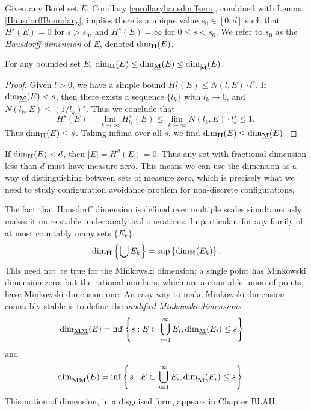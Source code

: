 Given any Borel set $E$, Corollary \ref{corollaryhausdorffzero}, combined with Lemma \ref{HausdorffBoundary}, implies there is a unique value $s_0 \in [0,d]$ such that $H^s(E) = 0$ for $s > s_0$, and $H^s(E) = \infty$ for $0 \leq s < s_0$. We refer to $s_0$ as the \emph{Hausdorff dimension} of $E$, denoted $\operatorname{\dim_{\mathbf{H}}}(E)$.

\begin{theorem}
	For any bounded set $E$, $\operatorname{\dim_{\mathbf{H}}}(E) \leq \operatorname{\dim_{\underline{\mathbf{M}}}}(E) \leq \operatorname{\dim_{\overline{\mathbf{M}}}}(E)$.
\end{theorem}
\begin{proof}
	Given $l > 0$, we have a simple bound $H^s_l(E) \leq N(l,E) \cdot l^s$. If $\operatorname{\dim_{\underline{\mathbf{M}}}}(E) < s$, then there exists a sequence $\{ l_k \}$ with $l_k \to 0$, and $N(l_k,E) \leq (1/l_k)^s$. Thus we conclude that
	\[ H^s(E) = \lim_{k \to \infty} H^s_{l_k}(E) \leq \lim_{k \to \infty} N(l_k,E) \cdot l_k^s \leq 1, \]
	Thus $\operatorname{\dim_{\mathbf{H}}}(E) \leq s$. Taking infima over all $s$, we find $\operatorname{\dim_{\mathbf{H}}}(E) \leq \operatorname{\dim_{\underline{\mathbf{M}}}}(E)$.
\end{proof}

\begin{remark}
	If $\operatorname{\dim_{\mathbf{H}}}(E) < d$, then $|E| = H^d(E) = 0$. Thus any set with fractional dimension less than $d$ must have measure zero. This means we can use the dimension as a way of distinguishing between sets of measure zero, which is precisely what we need to study configuration avoidance problem for non-discrete configurations.
\end{remark}

The fact that Hausdorff dimension is defined over multiple scales simultaneously makes it more stable under analytical operations. In particular, for any family of at most countably many sets $\{ E_k \}$,
%
\[ \operatorname{\dim_{\mathbf{H}}} \left\{ \bigcup E_k \right\} = \sup \left\{ \operatorname{\dim_{\mathbf{H}}}(E_k) \right\}. \]
%
This need not be true for the Minkowski dimension; a single point has Minkowski dimension zero, but the rational numbers, which are a countable union of points, have Minkowski dimension one. An easy way to make Minkowski dimension countably stable is to define the \emph{modified Minkowski dimensions}
%
\begin{align*}
	\operatorname{\dim_{\underline{\mathbf{MM}}}}(E) &= \inf \left\{ s : E \subset \bigcup_{i = 1}^\infty E_i, \operatorname{\dim_{\underline{\mathbf{M}}}}(E_i) \leq s \right\}
\end{align*}
%
and
%
\begin{align*}
	\operatorname{\dim_{\overline{\mathbf{MM}}}}(E) &= \inf \left\{ s : E \subset \bigcup_{i = 1}^\infty E_i, \operatorname{\dim_{\overline{\mathbf{M}}}}(E_i) \leq s \right\}.
\end{align*}
%
This notion of dimension, in a disguised form, appears in Chapter BLAH.








